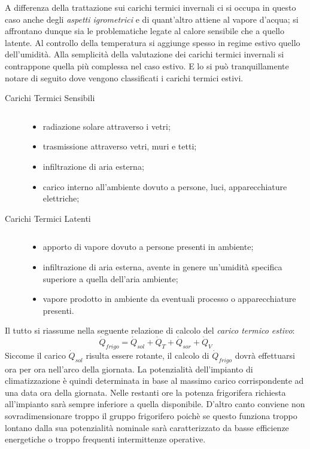 A differenza della trattazione sui carichi termici invernali ci si occupa in questo caso anche degli \emph{aspetti igrometrici} e di quant'altro attiene al vapore d'acqua; si affrontano dunque sia le problematiche legate al calore sensibile che a quello latente. Al controllo della temperatura si aggiunge spesso in regime estivo quello dell'umidità. Alla semplicità della valutazione dei carichi termici invernali si contrappone quella più complessa nel caso estivo. E lo si può tranquillamente notare di seguito dove vengono classificati i carichi termici estivi.
\begin{description}
	\item[Carichi Termici Sensibili] $ $
	\begin{itemize}
		\item radiazione solare attraverso i vetri;
		\item trasmissione attraverso vetri, muri e tetti;
		\item infiltrazione di aria esterna;
		\item carico interno all'ambiente dovuto a persone, luci, apparecchiature elettriche;
	\end{itemize}
	\item[Carichi Termici Latenti] $ $
	\begin{itemize}
		\item apporto di vapore dovuto a persone presenti in ambiente;
		\item infiltrazione di aria esterna, avente in genere un'umidità specifica superiore a quella dell'aria ambiente;
		\item vapore prodotto in ambiente da eventuali processo o apparecchiature presenti.
	\end{itemize}
\end{description}
Il tutto si riassume nella seguente relazione di calcolo del \emph{carico termico estivo}:
\begin{equation}
	\label{caricotermico:estivo}
	\dot{Q}_{frigo}=\dot{Q}_{sol}+\dot{Q}_T+\dot{Q}_{sor}+\dot{Q}_V
\end{equation}
Siccome il carico $\dot{Q}_{sol}$ risulta essere rotante, il calcolo di $\dot{Q}_{frigo}$ dovrà effettuarsi ora per ora nell'arco della giornata. La potenzialità dell'impianto di climatizzazione è quindi determinata in base al massimo carico corrispondente ad una data ora della giornata. Nelle restanti ore la potenza frigorifera richiesta all'impianto sarà sempre inferiore a quella disponibile. D'altro canto conviene non sovradimensionare troppo il gruppo frigorifero poichè se questo funziona troppo lontano dalla sua potenzialità nominale sarà caratterizzato da basse efficienze energetiche o troppo frequenti intermittenze operative. 

